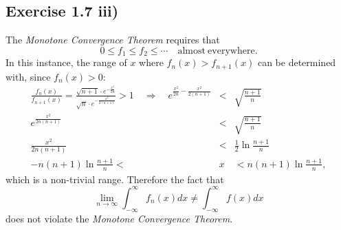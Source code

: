 \documentclass[final,3p,authoryear]{elsarticle}
\begin{document}
	\subsection{Exercise 1.7 iii)}
		The {\it Monotone Convergence Theorem} requires that
		\begin{equation}
			0 \leq f_1 \leq f_2 \leq \cdots \quad \mathrm{almost~everywhere}
			.
		\end{equation}
		In this instance, the range of $x$ where $f_n(x)>f_{n+1}(x)$ can be determined with, since $f_n(x)>0$:
		\begin{eqnarray}
			\frac{f_n(x)}{f_{n+1}(x)} = \frac{\sqrt{n+1} \cdot e^{-\frac{x^2}{2n}}}{\sqrt{n} \cdot e^{-\frac{x^2}{2(n+1)}}} > 1
			\quad\Rightarrow\quad
			e^{\frac{x^2}{2n}-\frac{x^2}{2(n+1)}} &<& \sqrt{\frac{n + 1}{n}}
			\nonumber\\
			e^{\frac{x^2}{2n(n+1)}} &<& \sqrt{\frac{n + 1}{n}}
			\nonumber\\
			\frac{x^2}{2n(n+1)} &<& \frac{1}{2} \ln{\frac{n + 1}{n}}
			\nonumber\\
			-n(n+1)\ln{\frac{n + 1}{n}} < &x& < n(n+1)\ln{\frac{n + 1}{n}}
			,
		\end{eqnarray}
		which is a non-trivial range. Therefore the fact that
		\begin{equation*}
			\lim\limits_{n \to \infty} \int_{-\infty}^{\infty} f_n(x) dx \neq \int_{-\infty}^{\infty} f(x) dx
		\end{equation*}
		does not violate the {\it Monotone Convergence Theorem}.
	

	
\appendix
\end{document}
